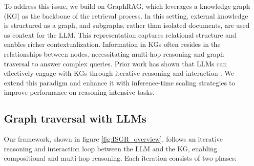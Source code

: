 To address this issue, we build on GraphRAG, which leverages a knowledge graph (KG) as the backbone of the retrieval process. In this setting, external knowledge is structured as a graph, and subgraphs, rather than isolated documents, are used as context for the LLM. This representation captures relational structure and enables richer contextualization. Information in KGs often resides in the relationships between nodes, necessitating multi-hop reasoning and graph traversal to answer complex queries. Prior work has shown that LLMs can effectively engage with KGs through iterative reasoning and interaction \citep{jin2024graph}. We extend this paradigm and enhance it with inference-time scaling strategies to improve performance on reasoning-intensive tasks.

\subsection{Graph traversal with LLMs}

Our framework, shown in figure \ref{fig:ISGR_overview}, follows an iterative reasoning and interaction loop between the LLM and the KG, enabling compositional and multi-hop reasoning. Each iteration consists of two phases:



